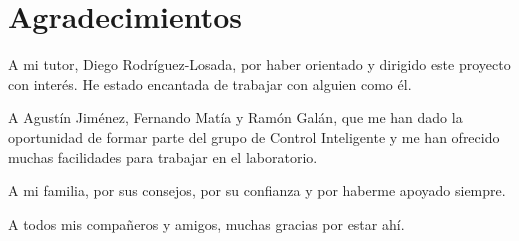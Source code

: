 
\chapter{Agradecimientos}

A mi tutor, Diego Rodríguez-Losada, por haber orientado y dirigido este proyecto con interés. He estado encantada de trabajar con alguien como él.

\vspace{5mm}
\noindent
A Agustín Jiménez, Fernando Matía y Ramón Galán, que me han dado la oportunidad de formar parte del grupo de Control Inteligente y me han ofrecido muchas facilidades para trabajar en el laboratorio.

\vspace{5mm}
\noindent
A mi familia, por sus consejos, por su confianza y por haberme apoyado siempre.

\vspace{5mm}
\noindent
A todos mis compañeros y amigos, muchas gracias por estar ahí. 